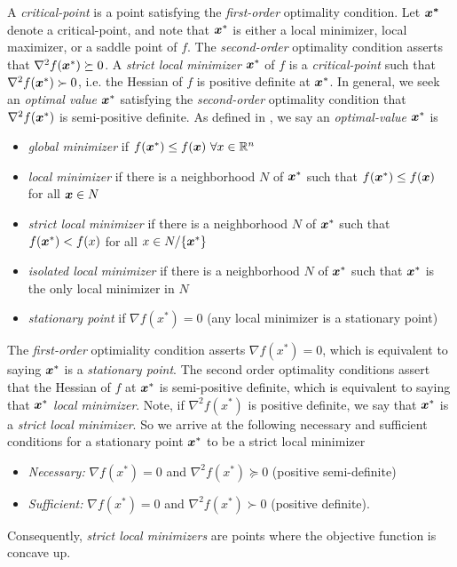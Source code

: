\documentclass[10pt]{article}
\begin{document}
    A \emph{critical-point} is a point satisfying the \emph{first-order} optimality condition.
    Let $\bm{x^*}$ denote a critical-point, and note that $\bm{x}^*$ is either a local minimizer, 
    local maximizer, or a saddle point of $f$.
    The \emph{second-order} optimality condition asserts that $\nabla^2 f(\bm{x}^*) \succeq 0$.
    A \emph{strict local minimizer} $\bm{x}^*$ of $f$ is a \emph{critical-point} such that
    $\nabla^2 f(\bm{x}^*) \succ 0$, i.e. the Hessian of $f$ is positive definite at $\bm{x}^*$.
    In general, we seek an \emph{optimal value} $\bm{x}^*$ satisfying the \emph{second-order}
    optimality condition that $\nabla^2 f(\bm{x}^*)$ is semi-positive definite.
        As defined in \cite{NocedalAndWright06}, we say an \emph{optimal-value} $\bm{x}^*$ is
    \begin{itemize}
        \item \emph{global minimizer} if $f(\bm{x}^*) \leq f(\bm{x}) ~ \forall x \in \mathbb{R}^n$
        \item \emph{local minimizer} if there is a neighborhood $N$ of $\bm{x}^*$
        such that $f(\bm{x}^*) \leq f(\bm{x})$ for all $\bm{x} \in N$
        \item \emph{strict local minimizer} if there is a neighborhood $N$ of $\bm{x}^*$
        such that $f(\bm{x}^*) < f(x)$ for all $x \in N / \{ \bm{x}^*\}$
        \item \emph{isolated local minimizer} if there is a neighborhood $N$ of $\bm{x}^*$
        such that $\bm{x}^*$ is the only local minimizer in $N$
        \item \emph{stationary point} if $\nabla f(x^*) = 0$ (any local minimizer is a stationary point)
    \end{itemize}
    \medskip
    The \emph{first-order} optimiality condition asserts $\nabla f(x^*) = 0$,
    which is equivalent to saying $\bm{x}^*$ is a \emph{stationary point}.
    The second order optimality conditions assert that the Hessian of $f$
    at $\bm{x}^*$ is semi-positive definite, which is
    equivalent to saying that $\bm{x}^*$ \emph{local minimizer}.
    Note, if $\nabla^2 f(x^*)$ is positive definite, we say that $\bm{x}^*$ is a \emph{strict local minimizer}.
    So we arrive at the following necessary and sufficient conditions for a stationary point $\bm{x}^*$ 
    to be a strict local minimizer
    \begin{itemize}
        \item \emph{Necessary:} $\nabla f(x^*) = 0$ and $\nabla^2 f(x^*) \succeq 0 $ (positive semi-definite)
        \item \emph{Sufficient:} $\nabla f(x^*) = 0$ and $\nabla^2 f(x^*) \succ 0$ (positive definite).
    \end{itemize}
    Consequently, \emph{strict local minimizers} are points where the objective function is concave up.
    \medskip
\end{document}
